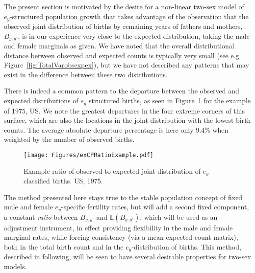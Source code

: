 \FloatBarrier
\label{sec:CRchap}
The present section is motivated by the desire for a non-linear two-sex model of
$e_y$-structured population growth that takes advantage of the observation that
the observed joint distribution of births by remaining years of fathers 
and mothers, $B_{y,y'}$, is in our experience very close to the expected
distribution, taking the male and female marginals as given. We have noted 
that the overall distributional distance
between observed and expected counts is typically very small (see e.g.
Figure~\ref{fig:TotalVarobsexpex}), but we have not described any patterns that
may exist in the difference between these two distributions. 

There is indeed a common pattern to the departure between the observed and
expected distributions of $e_y$ structured births, as seen in Figure~\ref{fig:exCPratioexample} for
the example of 1975, US. We note the greatest departures in the four extreme
corners of this surface, which are also the locations in the joint distribution 
with the lowest birth counts. The average absolute departure percentage is here
only 9.4\% when weighted by the number of observed births.

\begin{figure}[!ht]
  \centering
    \caption{Example ratio of observed to expected joint distribution of
    $e_y$-classified births. US, 1975.}
     \texttt{[image: Figures/exCPRatioExample.pdf]}
     \label{fig:exCPratioexample}
\end{figure}

The method presented here stays true to the stable population concept
 of fixed male and female $e_y$-specific fertility rates, but will add a second
 fixed component, a constant \textit{ratio} between $B_{y,y'}$ and
 $\mathbb{E}(B_{y,y'})$, which will be used as an adjustment instrument, in
 effect providing flexibility in the male and female marginal rates, while forcing
 consistency (via a mean expected count matrix), both in the total birth count
 and in the $e_y$-distribution of births. This method, described in
 following, will be seen to have several desirable properties for two-sex
 models.
 
\FloatBarrier


